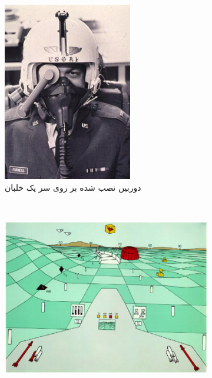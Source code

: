 \begin{figure}
	\centering
	\begin{subfigure}[b]{0.4\textwidth}
		\includegraphics[width=\textwidth]{image/airforce1}
		\caption{دوربین نصب شده بر روی سر یک خلبان}
		\label{fig:airforce1}
	\end{subfigure}
	~ %
	\begin{subfigure}[b]{0.5\textwidth}
		\includegraphics[width=\textwidth]{image/airforce2}

\end{subfigure}
\end{figure}
